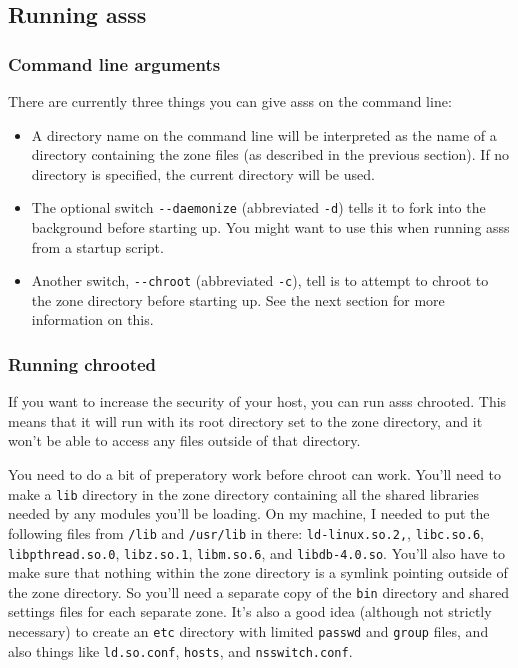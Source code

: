 \documentclass{article}
\newcommand{\asss}{asss}
\begin{document}
\subsection{Running \asss{}}

\subsubsection{Command line arguments}

There are currently three things you can give \asss{} on the command
line:

\begin{itemize}

\item A directory name on the command line will be interpreted as the
name of a directory containing the zone files (as described in the
previous section). If no directory is specified, the current directory
will be used.

\item The optional switch \verb/--daemonize/ (abbreviated \verb/-d/)
tells it to fork into the background before starting up. You might want
to use this when running \asss{} from a startup script.

\item Another switch, \verb/--chroot/ (abbreviated \verb/-c/), tell is
to attempt to chroot to the zone directory before starting up. See the
next section for more information on this.

\end{itemize}

\subsubsection{Running chrooted}

If you want to increase the security of your host, you can run \asss{}
chrooted. This means that it will run with its root directory set to the
zone directory, and it won't be able to access any files outside of that
directory.

You need to do a bit of preperatory work before chroot can work. You'll
need to make a \verb/lib/ directory in the zone directory containing all
the shared libraries needed by any modules you'll be loading. On my
machine, I needed to put the following files from \verb+/lib+ and
\verb+/usr/lib+ in there:
\verb/ld-linux.so.2,/,
\verb/libc.so.6/,
\verb/libpthread.so.0/,
\verb/libz.so.1/,
\verb/libm.so.6/, and
\verb/libdb-4.0.so/.
You'll also have to make sure that nothing within the zone directory is
a symlink pointing outside of the zone directory. So you'll need a
separate copy of the \verb/bin/ directory and shared settings files for
each separate zone. It's also a good idea (although not strictly
necessary) to create an \verb/etc/ directory with limited \verb/passwd/
and \verb/group/ files, and also things like \verb/ld.so.conf/,
\verb/hosts/, and \verb/nsswitch.conf/.
\end{document}

